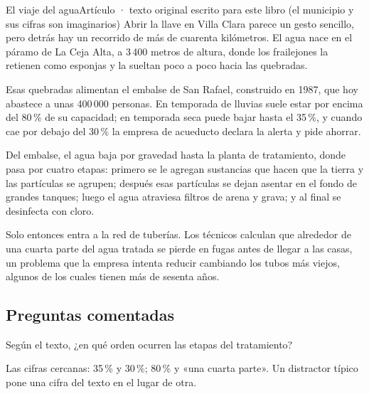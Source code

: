 \begin{texto}{El viaje del agua}{Artículo · texto original escrito para este libro (el municipio y sus cifras son imaginarios)}
\pa Abrir la llave en Villa Clara parece un gesto sencillo, pero detrás hay un recorrido de más de cuarenta kilómetros. El
agua nace en el páramo de La Ceja Alta, a 3\,400 metros de altura, donde los frailejones la retienen como esponjas y la
sueltan poco a poco hacia las quebradas.

\pa Esas quebradas alimentan el embalse de San Rafael, construido en 1987, que hoy abastece a unas 400\,000 personas. En
temporada de lluvias suele estar por encima del 80\,\% de su capacidad; en temporada seca puede bajar hasta el 35\,\%, y
cuando cae por debajo del 30\,\% la empresa de acueducto declara la alerta y pide ahorrar.

\pa Del embalse, el agua baja por gravedad hasta la planta de tratamiento, donde pasa por cuatro etapas: primero se le
agregan sustancias que hacen que la tierra y las partículas se agrupen; después esas partículas se dejan asentar en el
fondo de grandes tanques; luego el agua atraviesa filtros de arena y grava; y al final se desinfecta con cloro.

\pa Solo entonces entra a la red de tuberías. Los técnicos calculan que alrededor de una cuarta parte del agua tratada se
pierde en fugas antes de llegar a las casas, un problema que la empresa intenta reducir cambiando los tubos más viejos,
algunos de los cuales tienen más de sesenta años.
\end{texto}

\subsection{Preguntas comentadas}
\begin{comentada}{Según el texto, ¿en qué orden ocurren las etapas del tratamiento?}
\end{comentada}

\begin{trampa}
Las cifras cercanas: 35\,\% y 30\,\%; 80\,\% y «una cuarta parte». Un distractor típico pone una cifra del texto en el
lugar de otra.
\end{trampa}


